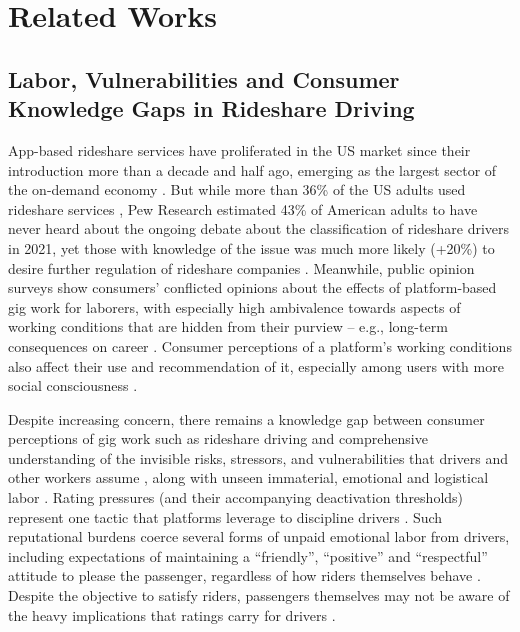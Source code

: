 
\section{Related Works}
\subsection{Labor, Vulnerabilities and Consumer Knowledge Gaps in Rideshare Driving} \label{stressors}
App-based rideshare services have proliferated in the US market since their introduction more than a decade and half ago, emerging as the largest sector of the on-demand economy \cite{making_out}. But while more than 36\% of the US adults used rideshare services \cite{jiang2019more}, Pew Research estimated 43\% of American adults to have never heard about the ongoing debate about the classification of rideshare drivers in 2021, yet those with knowledge of the issue was much more likely (+20\%) to desire further regulation of rideshare companies \cite{pew}. Meanwhile, public opinion surveys show consumers' conflicted opinions about the effects of platform-based gig work for laborers, with especially high ambivalence towards aspects of working conditions that are hidden from their purview -- e.g., long-term consequences on career \cite{triangle}. Consumer perceptions of a platform's working conditions also affect their use and recommendation of it, especially among users with more social consciousness \cite{role}.

Despite increasing concern, there remains a knowledge gap between consumer perceptions of gig work such as rideshare driving and comprehensive understanding of the invisible risks, stressors, and vulnerabilities that drivers and other workers assume \cite{navigating, hazards, distress}, along with unseen immaterial, emotional and logistical labor \cite{immaterial, exploitation}. 
Rating pressures (and their accompanying deactivation thresholds) represent one tactic that platforms leverage to discipline drivers \cite{rating}. 
Such reputational burdens coerce several forms of unpaid emotional labor from drivers, including expectations of maintaining a ``friendly'', ``positive'' and ``respectful'' attitude to please the passenger, regardless of how riders themselves behave \cite{mediatization}.
Despite the objective to satisfy riders, passengers themselves may not be aware of the heavy implications that ratings carry for drivers \cite{immaterial, translating}. 

